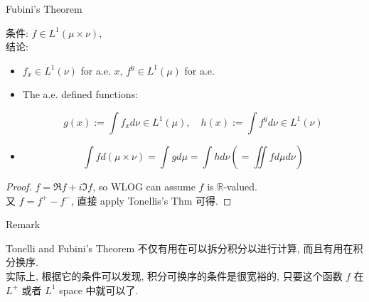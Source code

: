 \documentclass{qlnotes-export}
\begin{document}
\begin{theorem}{Fubini's Theorem}\label{thm-06-product-measure-fubini-tonelli-fubini-s-theorem}

条件: \(f \in L^{1}(\mu \times \nu)\),\\
结论:

\begin{itemize}
\item
  \(f_{x} \in L^{1}(\nu)\) for a.e. \(x\), \(f^{y} \in L^{1}(\mu)\) for a.e.
\item
  The a.e. defined functions:

  \[g(x) := \int f_{x} d\nu \in L^{1}(\mu),\quad h(x) := \int f^{y} d\nu \in L^{1}(\nu)\]
\item
  \[\int f d(\mu \times \nu) = \int g d\mu = \int h d\nu( = \iint f d\mu d\nu)\]
\end{itemize}

\end{theorem}

\begin{proof}

\(f = \Re f + i\Im f\), so WLOG can assume \(f\) is \(\mathbb{R}\)-valued.\\
又 \(f = f^{+} - f^{-}\), 直接 apply Tonellis's Thm 可得.

\end{proof}

\begin{qlremark}{Remark}

Tonelli and Fubini's Theorem 不仅有用在可以拆分积分以进行计算, 而且有用在积分换序.\\
实际上, 根据它的条件可以发现, 积分可换序的条件是很宽裕的, 只要这个函数 \(f\) 在 \(L^{+}\) 或者 \(L^{1}\) space 中就可以了.

\end{qlremark}
\end{document}
